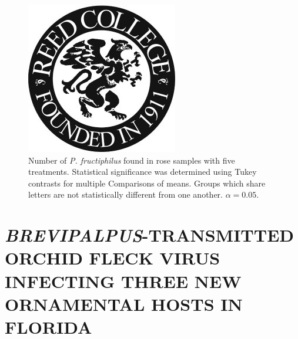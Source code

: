 \documentclass[12pt,final,CPage]{ufthesis}
\begin{document}
{\begin{figure}
  {\centering \includegraphics[width=0.8\linewidth]{figure/reed} 

  }

  \caption{Number of \textit{P. fructiphilus} found in rose samples with five treatments. Statistical significance was determined using Tukey contrasts for multiple Comparisons of means. Groups which share letters are not statistically different from one another. $\alpha = 0.05$.}\label{fig:unnamed-chunk-4}
  \end{figure}
  \hypertarget{brevipalpus-transmitted-orchid-fleck-virus-infecting-three-new-ornamental-hosts-in-florida}{%
  \chapter{\texorpdfstring{\emph{BREVIPALPUS}-TRANSMITTED ORCHID FLECK VIRUS INFECTING THREE NEW ORNAMENTAL HOSTS IN FLORIDA}{BREVIPALPUS-TRANSMITTED ORCHID FLECK VIRUS INFECTING THREE NEW ORNAMENTAL HOSTS IN FLORIDA}}\label{brevipalpus-transmitted-orchid-fleck-virus-infecting-three-new-ornamental-hosts-in-florida}}

}
\end{document}
